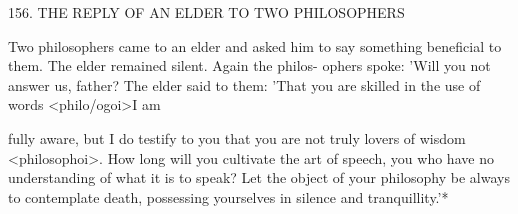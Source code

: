 156.
THE REPLY OF AN ELDER
TO TWO PHILOSOPHERS

Two philosophers came to an elder and asked him to say something
beneficial to them.
The elder remained silent.
Again the philos-
ophers spoke: 'Will you not answer us, father? The elder said to
them: 'That you are skilled in the use of words <philo/ogoi>I am

fully aware, but I do testify to you that you are not truly lovers of
wisdom <philosophoi>.
How long will you cultivate the art of
speech, you who have no understanding of what it is to speak? Let
the object of your philosophy be always to contemplate death,
possessing yourselves in silence and tranquillity.'*

